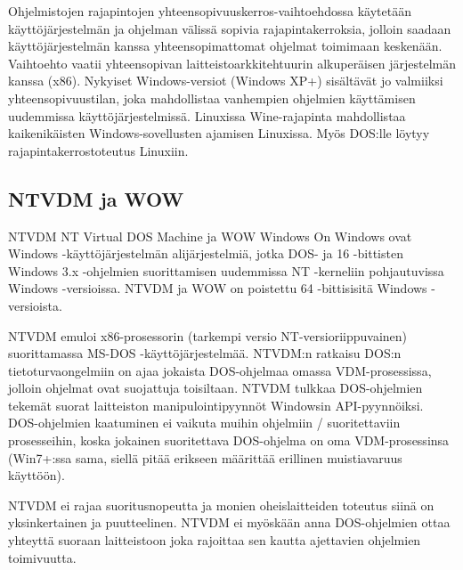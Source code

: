 


Ohjelmistojen rajapintojen yhteensopivuuskerros-vaihtoehdossa  käytetään käyttöjärjestelmän ja ohjelman välissä sopivia rajapintakerroksia, jolloin saadaan käyttöjärjestelmän kanssa yhteensopimattomat ohjelmat toimimaan keskenään. Vaihtoehto vaatii yhteensopivan laitteistoarkkitehtuurin alkuperäisen järjestelmän kanssa (x86). Nykyiset Windows-versiot (Windows XP+) sisältävät jo valmiiksi yhteensopivuustilan, joka mahdollistaa vanhempien ohjelmien käyttämisen uudemmissa käyttöjärjestelmissä. Linuxissa Wine-rajapinta mahdollistaa kaikenikäisten Windows-sovellusten ajamisen Linuxissa. Myös DOS:lle löytyy rajapintakerrostoteutus Linuxiin.

\subsection{NTVDM ja WOW}

NTVDM NT Virtual DOS Machine ja WOW Windows On Windows ovat Windows -käyttöjärjestelmän alijärjestelmiä, jotka DOS- ja 16 -bittisten Windows 3.x -ohjelmien suorittamisen uudemmissa NT -kerneliin pohjautuvissa Windows -versioissa. NTVDM ja WOW on poistettu 64 -bittisisitä Windows -versioista.

NTVDM emuloi x86-prosessorin (tarkempi versio NT-versioriippuvainen) suorittamassa MS-DOS -käyttöjärjestelmää. NTVDM:n ratkaisu DOS:n tietoturvaongelmiin on ajaa jokaista DOS-ohjelmaa omassa VDM-prosessissa, jolloin ohjelmat ovat suojattuja toisiltaan. NTVDM tulkkaa DOS-ohjelmien tekemät suorat laitteiston manipulointipyynnöt Windowsin API-pyynnöiksi. DOS-ohjelmien kaatuminen ei vaikuta muihin ohjelmiin / suoritettaviin prosesseihin, koska jokainen suoritettava DOS-ohjelma on oma VDM-prosessinsa (Win7+:ssa sama, siellä pitää erikseen määrittää erillinen muistiavaruus käyttöön).

NTVDM ei rajaa suoritusnopeutta ja monien oheislaitteiden toteutus siinä on yksinkertainen ja puutteelinen. NTVDM ei myöskään anna DOS-ohjelmien ottaa yhteyttä suoraan laitteistoon joka rajoittaa sen kautta ajettavien ohjelmien toimivuutta.


\lipsum[1-2]


